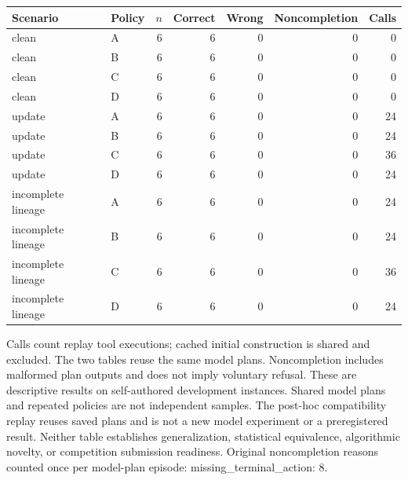 \documentclass{article}
\begin{document}
\begin{center}

{\footnotesize\setlength{\tabcolsep}{3pt}\begin{tabular}{llrrrrr}\hline

Scenario & Policy & $n$ & Correct & Wrong & Noncompletion & Calls \\\hline

clean & A & 6 & 6 & 0 & 0 & 0 \\

clean & B & 6 & 6 & 0 & 0 & 0 \\

clean & C & 6 & 6 & 0 & 0 & 0 \\

clean & D & 6 & 6 & 0 & 0 & 0 \\

update & A & 6 & 6 & 0 & 0 & 24 \\

update & B & 6 & 6 & 0 & 0 & 24 \\

update & C & 6 & 6 & 0 & 0 & 36 \\

update & D & 6 & 6 & 0 & 0 & 24 \\

incomplete lineage & A & 6 & 6 & 0 & 0 & 24 \\

incomplete lineage & B & 6 & 6 & 0 & 0 & 24 \\

incomplete lineage & C & 6 & 6 & 0 & 0 & 36 \\

incomplete lineage & D & 6 & 6 & 0 & 0 & 24 \\

\hline\end{tabular}}\end{center}

Calls count replay tool executions; cached initial construction is shared and excluded. The two tables reuse the same model plans. Noncompletion includes malformed plan outputs and does not imply voluntary refusal. These are descriptive results on self-authored development instances. Shared model plans and repeated policies are not independent samples. The post-hoc compatibility replay reuses saved plans and is not a new model experiment or a preregistered result. Neither table establishes generalization, statistical equivalence, algorithmic novelty, or competition submission readiness. Original noncompletion reasons counted once per model-plan episode: missing\_terminal\_action: 8.
\end{document}

